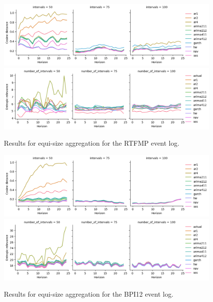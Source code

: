 \begin{figure}
    \centering
    \includegraphics[width=\textwidth]{img/rtfmp_cosine_equisize.png}
    \includegraphics[width=\textwidth]{img/rtfmp_entropic_equisize.png}
    \caption{Results for equi-size aggregation for the RTFMP event log.}
    \label{fig:rtfmp_equisize}
\end{figure}

\begin{figure}
    \centering
    \includegraphics[width=\textwidth]{img/bpi12_cosine_equitemp.png}
    \includegraphics[width=\textwidth]{img/bpi12_entropic_equitemp.png}
    \caption{Results for equi-size aggregation for the BPI12 event log.}
    \label{fig:bpi12_equitemp}
\end{figure}

